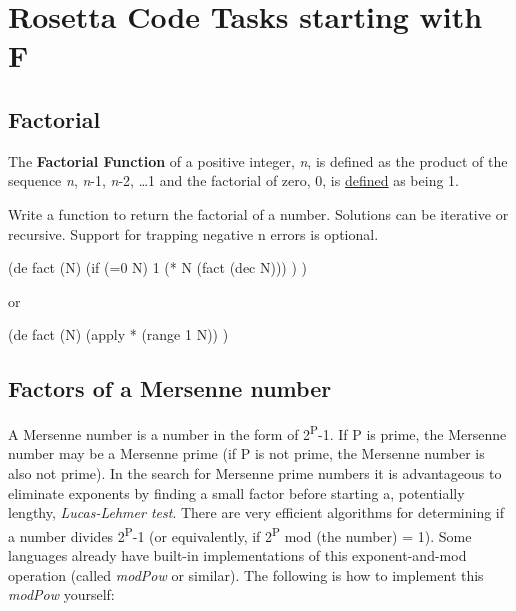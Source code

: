%
%
%

\chapter{Rosetta Code Tasks starting with F}

\section*{Factorial}

The \textbf{Factorial Function} of a positive integer, \emph{n}, is
defined as the product of the sequence \emph{n}, \emph{n}-1, \emph{n}-2,
\ldots{}1 and the factorial of zero, 0, is
\href{http://en.wikipedia.org/wiki/Factorial\#Definition}{defined} as
being 1.

Write a function to return the factorial of a number. Solutions can be
iterative or recursive. Support for trapping negative n errors is
optional.

\begin{wideverbatim}

(de fact (N)
   (if (=0 N)
      1
      (* N (fact (dec N))) ) )

or

(de fact (N)
   (apply * (range 1 N)) )

\end{wideverbatim}

\pagebreak{}
\section*{Factors of a Mersenne number}

A Mersenne number is a number in the form of 2\textsuperscript{P}-1.
If P is prime, the Mersenne number may be a Mersenne prime (if P is
not prime, the Mersenne number is also not prime). In the search for
Mersenne prime numbers it is advantageous to eliminate exponents by
finding a small factor before starting a, potentially lengthy,
\emph{Lucas-Lehmer test}. There are very efficient algorithms for
determining if a number divides 2\textsuperscript{P}-1 (or
equivalently, if 2\textsuperscript{P} mod (the number) = 1). Some
languages already have built-in implementations of this
exponent-and-mod operation (called \emph{modPow} or similar). The
following is how to implement this \emph{modPow} yourself:


